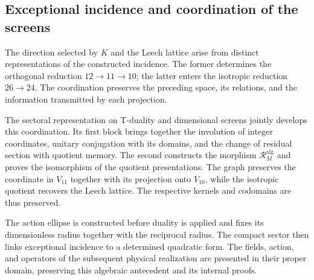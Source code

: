 \subsection{Exceptional incidence and coordination of the screens}
\label{exc:pantallas-dualidad}

The direction selected by \(K\) and the Leech lattice arise from distinct
representations of the constructed incidence. The former determines the
orthogonal reduction \(12\to11\to10\); the latter enters the isotropic
reduction \(26\to24\). The coordination preserves the preceding space, its
relations, and the information transmitted by each projection.

The sectoral representation on T-duality and dimensional screens jointly
develops this coordination. Its first block brings together the involution of
integer coordinates, unitary conjugation with its domains, and the change of
residual section with quotient memory. The second constructs the morphism
\(\mathcal R_M^{\mathrm{alg}}\) and proves the isomorphism of the quotient
presentations. The graph preserves the coordinate in \(V_{11}\) together
with its projection onto \(V_{10}\), while the isotropic quotient recovers
the Leech lattice. The respective kernels and codomains are thus preserved.

The action ellipse is constructed before duality is applied and fixes its
dimensionless radius together with the reciprocal radius. The compact sector
then links exceptional incidence to a determined quadratic form. The fields,
action, and operators of the subsequent physical realization are presented
in their proper domain, preserving this algebraic antecedent and its internal
proofs.
